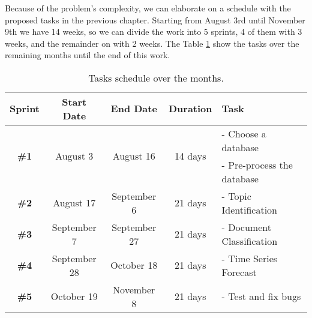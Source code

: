 Because of the problem's complexity, we can elaborate on a schedule with the proposed tasks in the previous chapter. Starting from August 3rd until November 9th we have 14 weeks, so we can divide the work into 5 sprints, 4 of them with 3 weeks, and the remainder on with 2 weeks. The Table \ref{tab:roadmap-table} show the tasks over the remaining months until the end of this work.

\begin{table}[h!]
	\centering
	\caption{Tasks schedule over the months.}
	\label{tab:roadmap-table}
	\begin{tabular}{c|cccl}
		\hline
		       \textbf{Sprint}        &    \textbf{Start Date}    &     \textbf{End Date}      &    \textbf{Duration}     & \textbf{Task}              \\ \hline
		\multirow{2}{*}{\textbf{\#1}} & \multirow{2}{*}{August 3} & \multirow{2}{*}{August 16} & \multirow{2}{*}{14 days} & - Choose a database         \\
		                              &                           &                            &                          & - Pre-process the database \\
		        \textbf{\#2}          &         August 17         &        September 6         &         21 days          & - Topic Identification     \\
		        \textbf{\#3}          &        September 7        &        September 27        &         21 days          & - Document Classification  \\
		        \textbf{\#4}          &       September 28        &         October 18         &         21 days          & - Time Series Forecast     \\
		        \textbf{\#5}          &        October 19         &         November 8         &         21 days          & - Test and fix bugs        \\ \hline
	\end{tabular}
\end{table}

